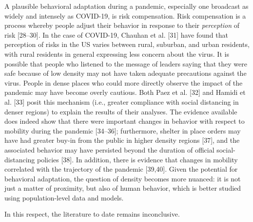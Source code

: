 \documentclass[10pt,letterpaper]{article}
\begin{document}
A plausible behavioral adaptation during a pandemic, especially one
broadcast as widely and intensely as COVID-19, is risk compensation.
Risk compensation is a process whereby people adjust their behavior in
response to their \emph{perception} of risk {[}28--30{]}. In the case of
COVID-19, Chauhan et al. {[}31{]} have found that perception of risks in
the US varies between rural, suburban, and urban residents, with rural
residents in general expressing less concern about the virus. It is
possible that people who listened to the message of leaders saying that
they were safe because of low density may not have taken adequate
precautions against the virus. People in dense places who could more
directly observe the impact of the pandemic may have become overly
cautious. Both Paez et al. {[}32{]} and Hamidi et al. {[}33{]} posit
this mechanism (i.e., greater compliance with social distancing in
denser regions) to explain the results of their analyses. The evidence
available does indeed show that there were important changes in behavior
with respect to mobility during the pandemic {[}34--36{]}; furthermore,
shelter in place orders may have had greater buy-in from the public in
higher density regions {[}37{]}, and the associated behavior may have
persisted beyond the duration of official social-distancing policies
{[}38{]}. In addition, there is evidence that changes in mobility
correlated with the trajectory of the pandemic {[}39,40{]}. Given the
potential for behavioral adaptation, the question of density becomes
more nuanced: it is not just a matter of proximity, but also of human
behavior, which is better studied using population-level data and
models.

In this respect, the literature to date remains inconclusive.
\end{document}
